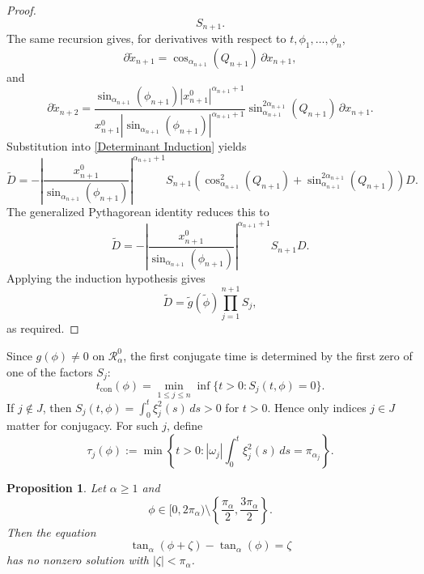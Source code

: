 \documentclass[12pt]{amsart}
\numberwithin{equation}{section}
\theoremstyle{plain}
\newtheorem{proposition}[theorem]{Proposition}%
\theoremstyle{definition}
\theoremstyle{remark}
\begin{document}
\begin{proof}
\[        S_{n+1}.
    \]
    The same recursion gives, for derivatives with respect to \(t,\phi_1,\ldots,\phi_n\),
    \[
        \partial \widetilde x_{n+1}
        =
        \cos_{\alpha_{n+1}}(Q_{n+1})\,\partial x_{n+1},
    \]
    and
    \[
        \partial \widetilde x_{n+2}
        =
        \frac{
            \sin_{\alpha_{n+1}}(\phi_{n+1})
            |x_{n+1}^0|^{\alpha_{n+1}+1}
        }{
            x_{n+1}^0
            |\sin_{\alpha_{n+1}}(\phi_{n+1})|^{\alpha_{n+1}+1}
        }
        \sin_{\alpha_{n+1}}^{2\alpha_{n+1}}(Q_{n+1})
        \,\partial x_{n+1}.
    \]
    Substitution into \eqref{Determinant Induction} yields
    \[
        \widetilde D
        =
        -
        \left|
        \frac{x_{n+1}^0}{\sin_{\alpha_{n+1}}(\phi_{n+1})}
        \right|^{\alpha_{n+1}+1}
        S_{n+1}
        \left(
        \cos_{\alpha_{n+1}}^2(Q_{n+1})
        +
        \sin_{\alpha_{n+1}}^{2\alpha_{n+1}}(Q_{n+1})
        \right)
        D.
    \]
    The generalized Pythagorean identity reduces this to
    \[
        \widetilde D
        =
        -
        \left|
        \frac{x_{n+1}^0}{\sin_{\alpha_{n+1}}(\phi_{n+1})}
        \right|^{\alpha_{n+1}+1}
        S_{n+1}D.
    \]
    Applying the induction hypothesis gives
    \[
        \widetilde D
        =
        \widetilde g(\widetilde\phi)
        \prod_{j=1}^{n+1}S_j,
    \]
    as required.
\end{proof}

Since \(g(\phi)\neq0\) on \(\mathcal R_\alpha^0\), the first conjugate time is determined
by the first zero of one of the factors \(S_j\):
\[
    t_{\operatorname{con}}(\phi)
    =
    \min_{1\leq j\leq n}
    \inf\{t>0:S_j(t,\phi)=0\}.
\]
If \(j\notin J\), then \(S_j(t,\phi)=\int_0^t\xi_j^2(s)\,ds>0\) for \(t>0\). Hence only
indices \(j\in J\) matter for conjugacy. For such \(j\), define
\begin{equation}\label{Conjectured Cut}
    \tau_j(\phi)
    :=
    \min
    \left\{
    t>0:
    |\omega_j|\int_0^t\xi_j^2(s)\,ds
    =
    \pi_{\alpha_j}
    \right\}.
\end{equation}

\begin{proposition}\label{tan function solution}
    Let \(\alpha\geq1\) and
    \[
        \phi\in[0,2\pi_\alpha)
        \setminus
        \left\{
        \frac{\pi_\alpha}{2},
        \frac{3\pi_\alpha}{2}
        \right\}.
    \]
    Then the equation
    \begin{equation}\label{tan equation}
        \tan_\alpha(\phi+\zeta)-\tan_\alpha(\phi)=\zeta
    \end{equation}
    has no nonzero solution with \(|\zeta|<\pi_\alpha\).
\end{proposition}
\end{document}
